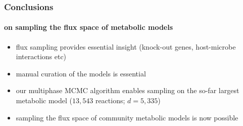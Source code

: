 \documentclass{beamer}
\begin{document}
   \begin{frame}
      \frametitle{Conclusions}
      \framesubtitle{on sampling the flux space of metabolic models}
      \small
      \begin{itemize}
         \item flux sampling provides essential insight (knock-out genes, host-microbe interactions etc)
         \item manual curation of the models is essential 
         \item our multiphase MCMC algorithm enables sampling on the so-far largest metabolic model ($13,543$ reactions; $d=5,335$)
         \item sampling the flux space of community metabolic models is now possible
      \end{itemize}

   \end{frame}
\end{document}
